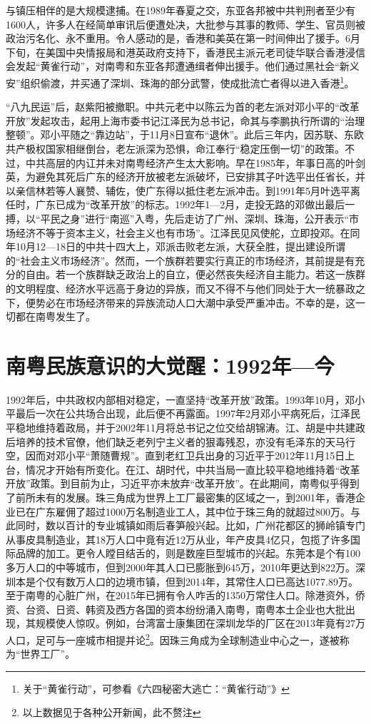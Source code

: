 与镇压相伴的是大规模逮捕。在1989年春夏之交，东亚各邦被中共判刑者至少有1600人，许多人在经简单审讯后便遭处决，大批参与其事的教师、学生、官员则被政治污名化、永不重用。令人感动的是，香港和美英在第一时间伸出了援手。6月下旬，在美国中央情报局和港英政府支持下，香港民主派元老司徒华联合香港浸信会发起“黄雀行动”，对南粤和东亚各邦遭通缉者伸出援手。他们通过黑社会“新义安”组织偷渡，并买通了深圳、珠海的部分武警，使成批流亡者得以进入香港\footnote{关于“黄雀行动”，可参看《六四秘密大逃亡：“黄雀行动”》}。

“八九民运”后，赵紫阳被撤职。中共元老中以陈云为首的老左派对邓小平的“改革开放”发起攻击，起用上海市委书记江泽民为总书记，命其与李鹏执行所谓的“治理整顿”。邓小平随之“靠边站”，于11月8日宣布“退休”。此后三年内，因苏联、东欧共产极权国家相继倒台，老左派深为恐惧，命江奉行“稳定压倒一切”的政策。不过，中共高层的内讧并未对南粤经济产生太大影响。早在1985年，年事日高的叶剑英，为避免其死后广东的经济开放被老左派破坏，已安排其子叶选平出任省长，并以亲信林若等人襄赞、辅佐，使广东得以抵住老左派冲击。到1991年5月叶选平离任时，广东已成为“改革开放”的标志。1992年1—2月，走投无路的邓做出最后一搏，以“平民之身”进行“南巡”入粤，先后走访了广州、深圳、珠海，公开表示“市场经济不等于资本主义，社会主义也有市场”。江泽民见风使舵，立即投邓。在同年10月12—18日的中共十四大上，邓派击败老左派，大获全胜，提出建设所谓的“社会主义市场经济”。然而，一个族群若要实行真正的市场经济，其前提是有充分的自由。若一个族群缺乏政治上的自立，便必然丧失经济自主能力。若这一族群的文明程度、经济水平远高于身边的异族，而又不得不与他们同处于大一统暴政之下，便势必在市场经济带来的异族流动人口大潮中承受严重冲击。不幸的是，这一切都在南粤发生了。

\section{南粤民族意识的大觉醒：1992年—今}

1992年后，中共政权内部相对稳定，一直坚持“改革开放”政策。1993年10月，邓小平最后一次在公共场合出现，此后便不再露面。1997年2月邓小平病死后，江泽民平稳地维持着政局，并于2002年11月将总书记之位交给胡锦涛。江、胡是中共建政后培养的技术官僚，他们缺乏老列宁主义者的狠毒残忍，亦没有毛泽东的天马行空，因而对邓小平“萧随曹规”。直到老红卫兵出身的习近平于2012年11月15日上台，情况才开始有所变化。在江、胡时代，中共当局一直比较平稳地维持着“改革开放”政策。到目前为止，习近平亦未放弃“改革开放”。在此期间，南粤似乎得到了前所未有的发展。珠三角成为世界上工厂最密集的区域之一，到2001年，香港企业已在广东雇佣了超过1000万名制造业工人，其中位于珠三角的就超过800万。与此同时，数以百计的专业城镇如雨后春笋般兴起。比如，广州花都区的狮岭镇专门从事皮具制造业，其18万人口中竟有近12万从业，年产皮具4亿只，包揽了许多国际品牌的加工。更令人瞠目结舌的，则是数座巨型城市的兴起。东莞本是个有100多万人口的中等城市，但到2000年其人口已膨胀到645万，2010年更达到822万。深圳本是个仅有数万人口的边境市镇，但到2014年，其常住人口已高达1077.89万。至于南粤的心脏广州，在2015年已拥有令人咋舌的1350万常住人口。除港资外，侨资、台资、日资、韩资及西方各国的资本纷纷涌入南粤，南粤本土企业也大批出现，其规模使人惊叹。例如，台湾富士康集团在深圳龙华的厂区在2013年竟有27万人口，足可与一座城市相提并论\footnote{以上数据见于各种公开新闻，此不赘注}。因珠三角成为全球制造业中心之一，遂被称为“世界工厂”。

